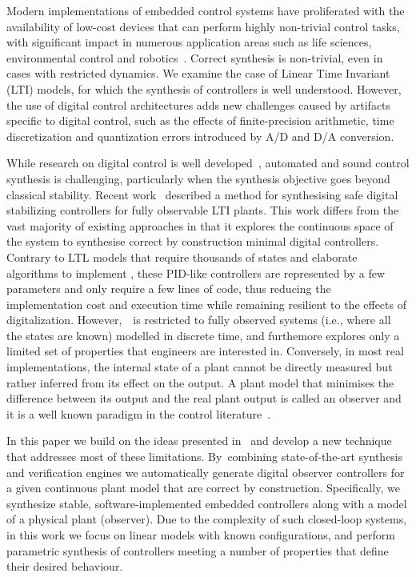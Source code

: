 \documentclass[sigconf]{llncs}
\begin{document}
Modern implementations of embedded control systems have proliferated with
the availability of low-cost devices that can perform highly non-trivial
control tasks, with significant impact in numerous application areas such as
life sciences, environmental control and robotics~\cite{astrom1997computer,Franklin15}.  Correct synthesis is non-trivial, even in cases with
restricted dynamics.  We examine the case of Linear Time Invariant (LTI)
models, for which the synthesis of controllers is well understood.  However,
the use of digital control architectures adds new challenges caused by
artifacts specific to digital control, such as the effects of
finite-precision arithmetic, time discretization and quantization errors
introduced by A/D and D/A conversion.

While research on digital control is well
developed~\cite{astrom1997computer}, automated and sound control synthesis
is challenging, particularly when the synthesis objective goes beyond
classical stability.  Recent work~\cite{abate2017automated} described a
method for synthesising safe digital stabilizing controllers for fully
observable LTI plants.  This work differs from the vast majority of existing
approaches in that it explores the continuous space of the system to
synthesise correct by construction minimal digital controllers.  Contrary to
LTL models that require thousands of states and elaborate algorithms to
implement \cite{reissig2017feedback}, these PID-like controllers are represented by a few parameters
and only require a few lines of code, thus reducing the implementation cost
and execution time while remaining resilient to the effects of digitalization.
However,~\cite{abate2017automated}~is restricted to fully observed
systems (i.e., where all the states are known) modelled in discrete time,
and furthemore explores only a limited set of properties that engineers
are interested in. Conversely, 
in most real implementations, the internal state of a plant cannot be
directly measured but rather inferred from its
effect on the output. A plant model that minimises the difference
between its output and the real plant output is called an observer and it is a well known
paradigm in the control literature~\cite{astrom1997computer}.


In this paper we build on the ideas presented in~\cite{abate2017automated}
and develop a new technique that addresses most of these limitations. 
By~combining state-of-the-art synthesis and verification engines we
automatically generate digital observer controllers for a given continuous
plant model that are correct by construction.  %
Specifically, we synthesize stable,
software-implemented embedded controllers along with a model of a physical
plant (observer).  Due to the complexity of such closed-loop systems, in
this work we focus on linear models with known configurations, and perform
parametric synthesis of controllers meeting a number of properties that
define their desired behaviour.
\end{document}
